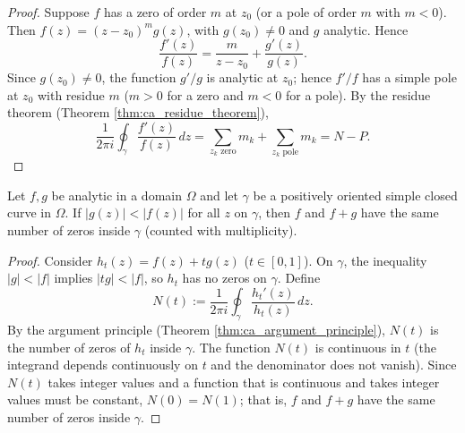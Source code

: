 \begin{proof}
Suppose $f$ has a zero of order $m$ at $z_0$ (or a pole of order $m$ with $m < 0$). Then $f(z) = (z - z_0)^m g(z)$, with $g(z_0) \neq 0$ and $g$ analytic. Hence
\[
\frac{f'(z)}{f(z)} = \frac{m}{z - z_0} + \frac{g'(z)}{g(z)}.
\]
Since $g(z_0) \neq 0$, the function $g'/g$ is analytic at $z_0$; hence $f'/f$ has a simple pole at $z_0$ with residue $m$ ($m > 0$ for a zero and $m < 0$ for a pole). By the residue theorem (Theorem \ref{thm:ca_residue_theorem}),
\[
\frac{1}{2\pi i} \oint_\gamma \frac{f'(z)}{f(z)} \, dz = \sum_{z_k \text{ zero}} m_k + \sum_{z_k \text{ pole}} m_k = N - P.
\]
\end{proof}

\begin{corollary}\label{cor:ca_rouche}
Let $f, g$ be analytic in a domain $\Omega$ and let $\gamma$ be a positively oriented simple closed curve in $\Omega$. If $|g(z)| < |f(z)|$ for all $z$ on $\gamma$, then $f$ and $f + g$ have the same number of zeros inside $\gamma$ (counted with multiplicity).
\end{corollary}

\begin{proof}
Consider $h_t(z) = f(z) + t g(z)$ ($t \in [0, 1]$). On $\gamma$, the inequality $|g| < |f|$ implies $|t g| < |f|$, so $h_t$ has no zeros on $\gamma$. Define
\[
N(t) := \frac{1}{2\pi i} \oint_\gamma \frac{h_t'(z)}{h_t(z)} \, dz.
\]
By the argument principle (Theorem \ref{thm:ca_argument_principle}), $N(t)$ is the number of zeros of $h_t$ inside $\gamma$. The function $N(t)$ is continuous in $t$ (the integrand depends continuously on $t$ and the denominator does not vanish). Since $N(t)$ takes integer values and a function that is continuous and takes integer values must be constant, $N(0) = N(1)$; that is, $f$ and $f + g$ have the same number of zeros inside $\gamma$.
\end{proof}

